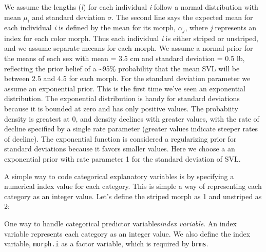 \documentclass[
]{book}
\newenvironment{Shaded}{\begin{snugshade}}{\end{snugshade}}
\newcommand{\DecValTok}[1]{\textcolor[rgb]{0.00,0.00,0.81}{#1}}
\newcommand{\FunctionTok}[1]{\textcolor[rgb]{0.13,0.29,0.53}{\textbf{#1}}}
\newcommand{\NormalTok}[1]{#1}
\newcommand{\OtherTok}[1]{\textcolor[rgb]{0.56,0.35,0.01}{#1}}
\newcommand{\SpecialCharTok}[1]{\textcolor[rgb]{0.81,0.36,0.00}{\textbf{#1}}}
\newcommand{\StringTok}[1]{\textcolor[rgb]{0.31,0.60,0.02}{#1}}
\begin{document}
We assume the lengths (\emph{l}) for each individual \emph{i} follow a normal distribution with mean \(\mu_i\) and standard deviation \(\sigma\). The second line says the expected mean for each individual \emph{i} is defined by the mean for its morph, \(\alpha_j\), where \emph{j} represents an index for each color morph. Thus each individual \emph{i} is either striped or unstriped, and we assume separate meeans for each morph. We assume a normal prior for the means of each sex with mean = 3.5 cm and standard deviation = 0.5 lb, reflecting the prior belief of a \textasciitilde95\% probability that the mean SVL will be between 2.5 and 4.5 for each morph. For the standard deviation parameter we assume an exponential prior. This is the first time we've seen an exponential distribution. The exponential distribution is handy for standard deviations because it is bounded at zero and has only positive values. The probabiity density is greatest at 0, and density declines with greater values, with the rate of decline specified by a single rate parameter (greater values indicate steeper rates of decline). The exponential function is considered a regularizing prior for standard deviations because it favors smaller values. Here we choose a an exponential prior with rate parameter 1 for the standard deviation of SVL.

A simple way to code categorical explanatory variables is by specifying a numerical index value for each category. This is simple a way of representing each category as an integer value. Let's define the striped morph as 1 and unstriped as 2:

\begin{Shaded}
\end{Shaded}

One way to handle categorical predictor variables\emph{index variable}. An index variable represents each category as an integer value. We also define the index variable, \texttt{morph.i} as a factor variable, which is required by \texttt{brms}.
\end{document}
